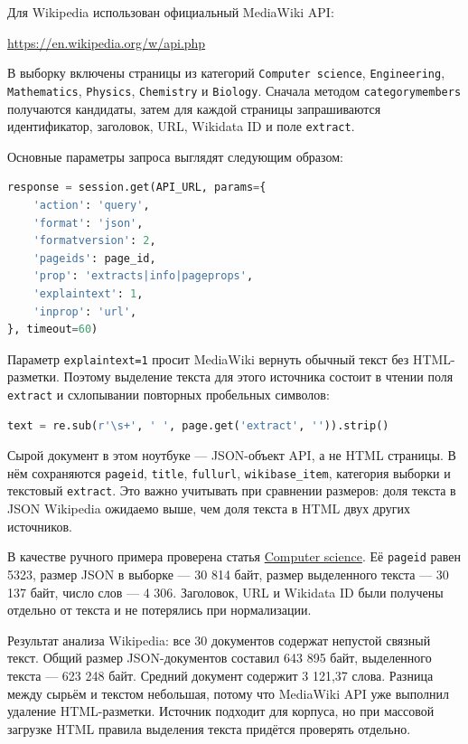 \documentclass[pdf,unicode,12pt,a4paper,oneside,fleqn]{article}
\begin{document}
Для Wikipedia использован официальный MediaWiki API:

\begin{center}
\url{https://en.wikipedia.org/w/api.php}
\end{center}

В выборку включены страницы из категорий \texttt{Computer science},
\texttt{Engineering}, \texttt{Mathematics}, \texttt{Physics},
\texttt{Chemistry} и \texttt{Biology}. Сначала методом
\texttt{categorymembers} получаются кандидаты, затем для каждой страницы
запрашиваются идентификатор, заголовок, URL, Wikidata ID и поле
\texttt{extract}.

Основные параметры запроса выглядят следующим образом:

\begin{lstlisting}[language=Python]
response = session.get(API_URL, params={
    'action': 'query',
    'format': 'json',
    'formatversion': 2,
    'pageids': page_id,
    'prop': 'extracts|info|pageprops',
    'explaintext': 1,
    'inprop': 'url',
}, timeout=60)
\end{lstlisting}

Параметр \texttt{explaintext=1} просит MediaWiki вернуть обычный текст без
HTML-разметки. Поэтому выделение текста для этого источника состоит в чтении
поля \texttt{extract} и схлопывании повторных пробельных символов:

\begin{lstlisting}[language=Python]
text = re.sub(r'\s+', ' ', page.get('extract', '')).strip()
\end{lstlisting}

Сырой документ в этом ноутбуке --- JSON-объект API, а не HTML страницы. В нём
сохраняются \texttt{pageid}, \texttt{title}, \texttt{fullurl},
\texttt{wikibase\_item}, категория выборки и текстовый \texttt{extract}. Это
важно учитывать при сравнении размеров: доля текста в JSON Wikipedia ожидаемо
выше, чем доля текста в HTML двух других источников.

В качестве ручного примера проверена статья
\href{https://en.wikipedia.org/wiki/Computer_science}{Computer science}. Её
\texttt{pageid} равен 5323, размер JSON в выборке --- 30 814 байт, размер
выделенного текста --- 30 137 байт, число слов --- 4 306. Заголовок, URL и
Wikidata ID были получены отдельно от текста и не потерялись при нормализации.

Результат анализа Wikipedia: все 30 документов содержат непустой связный текст.
Общий размер JSON-документов составил 643 895 байт, выделенного текста ---
623 248 байт. Средний документ содержит 3 121,37 слова. Разница между сырьём и
текстом небольшая, потому что MediaWiki API уже выполнил удаление HTML-разметки.
Источник подходит для корпуса, но при массовой загрузке HTML правила выделения
текста придётся проверять отдельно.
\end{document}

